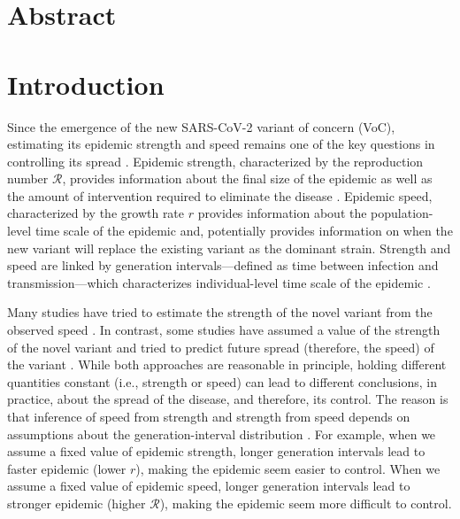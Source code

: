 \documentclass[12pt]{article}
\date{\today}
\newcommand{\RR}{\ensuremath{{\mathcal R}}\xspace}
\begin{document}
\begin{flushleft}{
	\Large
	\textbf{}
}
\end{flushleft}

\section*{Abstract}

\section{Introduction}

Since the emergence of the new SARS-CoV-2 variant of concern (VoC), estimating its epidemic strength and speed remains one of the key questions in controlling its spread \citep{switzerland2021variant, davies2021estimated, di2021impact, leung2021early, volz2021transmission,zhao2021}.
Epidemic strength, characterized by the reproduction number $\RR$, provides information about the final size of the epidemic as well as the amount of intervention required to eliminate the disease \citep{anderson1991infectious}.
Epidemic speed, characterized by the growth rate $r$ provides information about the population-level time scale of the epidemic and, potentially provides information on when the new variant will replace the existing variant as the dominant strain.
Strength and speed are linked by generation intervals---defined as time between infection and transmission---which characterizes individual-level time scale of the epidemic \citep{roberts2007model,svensson2007note,wallinga2007generation}.

Many studies have tried to estimate the strength of the novel variant from the observed speed \citep{davies2021estimated, leung2021early, volz2021transmission,zhao2021}.
In contrast, some studies have assumed a value of the strength of the novel variant and tried to predict future spread (therefore, the speed) of the variant \citep{davies2021estimated}.
While both approaches are reasonable in principle, holding different quantities constant (i.e., strength or speed) can lead to different conclusions, in practice, about the spread of the disease, and therefore, its control.
The reason is that inference of speed from strength and strength from speed depends on assumptions about the generation-interval distribution \citep{roberts2007model,svensson2007note,wallinga2007generation,dushoff2020speed}.
For example, when we assume a fixed value of epidemic strength, longer generation intervals lead to faster epidemic (lower $r$), making the epidemic seem easier to control.
When we assume a fixed value of epidemic speed, longer generation intervals lead to stronger epidemic (higher $\RR$), making the epidemic seem more difficult to control.
\end{document}
